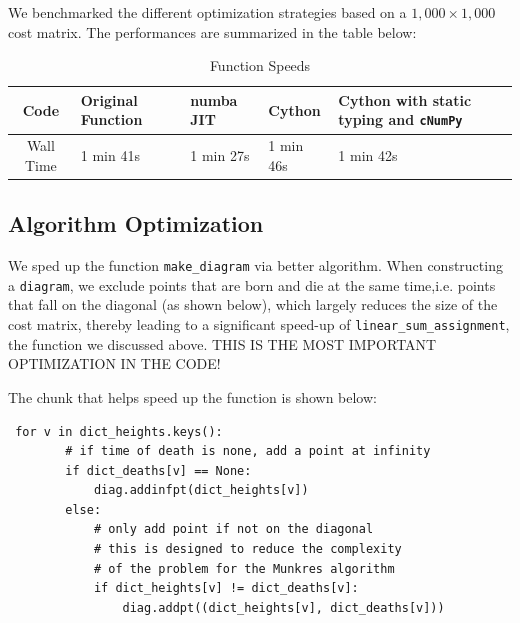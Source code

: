 \documentclass[11pt]{amsart}
\begin{document}
We benchmarked the different optimization strategies based on a $1,000 \times 1,000$ cost matrix. The performances are  summarized in the table below:
\begin{table}[]
\centering
\caption{Function Speeds}
\label{my-label}
\begin{tabular}{@{}|c|l|l|l|l|@{}}
\toprule
Code      & Original Function & numba JIT & Cython    & Cython with static typing and \texttt{cNumPy} \\ \midrule
Wall Time & 1 min 41s         & 1 min 27s & 1 min 46s & 1 min 42s                                       \\ \bottomrule
\end{tabular}
\end{table}

\subsection{Algorithm Optimization}
We sped up the function \texttt{make\_diagram} via better algorithm. When constructing a \texttt{diagram}, we exclude points that are born and die at the same time,i.e. points that fall on the diagonal (as shown below), which largely reduces the size of the cost matrix, thereby leading to a significant speed-up of \texttt{linear\_sum\_assignment}, the function we discussed above.  THIS IS THE MOST IMPORTANT OPTIMIZATION IN THE CODE!

The chunk that helps speed up the function is shown below:
\begin{verbatim}
 for v in dict_heights.keys():
        # if time of death is none, add a point at infinity
        if dict_deaths[v] == None:
            diag.addinfpt(dict_heights[v])
        else:
            # only add point if not on the diagonal
            # this is designed to reduce the complexity
            # of the problem for the Munkres algorithm
            if dict_heights[v] != dict_deaths[v]:
                diag.addpt((dict_heights[v], dict_deaths[v]))
\end{verbatim}
\end{document}

